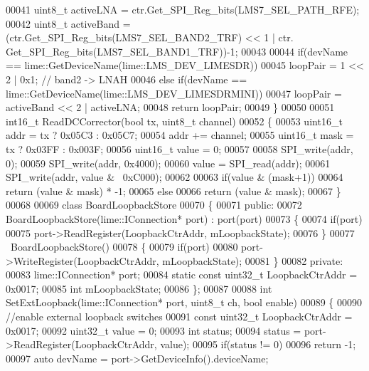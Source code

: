 \begin{DoxyCode}
00041     uint8\_t activeLNA = ctr.Get_SPI_Reg_bits(LMS7_SEL_PATH_RFE);
00042     uint8\_t activeBand = (ctr.Get_SPI_Reg_bits(LMS7_SEL_BAND2_TRF) << 1 | ctr.
      Get_SPI_Reg_bits(LMS7_SEL_BAND1_TRF))-1;
00043 
00044     \textcolor{keywordflow}{if}(devName == lime::GetDeviceName(lime::LMS_DEV_LIMESDR))
00045         loopPair = 1 << 2 | 0x1; \textcolor{comment}{// band2 -> LNAH}
00046     \textcolor{keywordflow}{else} \textcolor{keywordflow}{if}(devName == lime::GetDeviceName(lime::LMS_DEV_LIMESDRMINI))
00047         loopPair = activeBand << 2 | activeLNA;
00048     \textcolor{keywordflow}{return} loopPair;
00049 \}
00050 
00051 int16\_t ReadDCCorrector(\textcolor{keywordtype}{bool} tx, uint8\_t channel)
00052 \{
00053     uint16\_t addr = tx ? 0x05C3 : 0x05C7;
00054     addr += channel;
00055     uint16\_t mask = tx ? 0x03FF : 0x003F;
00056     uint16\_t value = 0;
00057 
00058     SPI_write(addr, 0);
00059     SPI_write(addr, 0x4000);
00060     value = SPI_read(addr);
00061     SPI_write(addr, value & ~0xC000);
00062 
00063     \textcolor{keywordflow}{if}(value & (mask+1))
00064         \textcolor{keywordflow}{return} (value & mask) * -1;
00065     \textcolor{keywordflow}{else}
00066         \textcolor{keywordflow}{return} (value & mask);
00067 \}
00068 
00069 \textcolor{keyword}{class }BoardLoopbackStore
00070 \{
00071 \textcolor{keyword}{public}:
00072     BoardLoopbackStore(lime::IConnection* port) : port(port)
00073     \{
00074         \textcolor{keywordflow}{if}(port)
00075             port->ReadRegister(LoopbackCtrAddr, mLoopbackState);
00076     \}
00077     ~BoardLoopbackStore()
00078     \{
00079         \textcolor{keywordflow}{if}(port)
00080             port->WriteRegister(LoopbackCtrAddr, mLoopbackState);
00081     \}
00082 \textcolor{keyword}{private}:
00083     lime::IConnection* port;
00084     \textcolor{keyword}{static} \textcolor{keyword}{const} uint32\_t LoopbackCtrAddr = 0x0017;
00085     \textcolor{keywordtype}{int} mLoopbackState;
00086 \};
00087 
00088 \textcolor{keywordtype}{int} SetExtLoopback(lime::IConnection* port, uint8\_t ch, \textcolor{keywordtype}{bool} enable)
00089 \{
00090     \textcolor{comment}{//enable external loopback switches}
00091     \textcolor{keyword}{const} uint32\_t LoopbackCtrAddr = 0x0017;
00092     uint32\_t value = 0;
00093     \textcolor{keywordtype}{int} status;
00094     status = port->ReadRegister(LoopbackCtrAddr, value);
00095     \textcolor{keywordflow}{if}(status != 0)
00096         \textcolor{keywordflow}{return} -1;
00097     \textcolor{keyword}{auto} devName = port->GetDeviceInfo().deviceName;

\end{DoxyCode}
